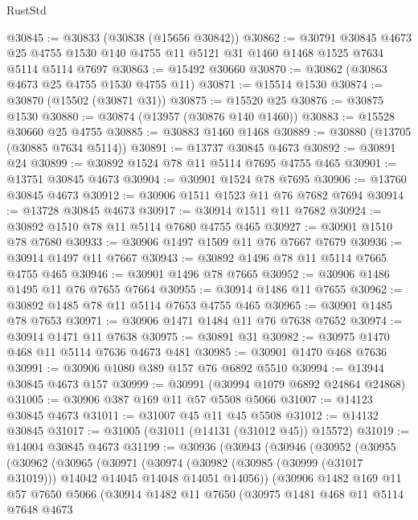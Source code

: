 \begin{lexlean}{RustStd}
\begin{coremodule}
@30845 := @30833 (@30838 (@15656 @30842))
@30862 := @30791
    @30845
    @4673
    @25
    @4755
    @1530
    @140
    @4755
    @11
    @5121
    @31
    @1460
    @1468
    @1525
    @7634
    @5114
    @5114
    @7697
@30863 := @15492 @30660
@30870 := @30862 (@30863 @4673 @25 @4755 @1530 @4755 @11)
@30871 := @15514 @1530
@30874 := @30870 (@15502 (@30871 @31))
@30875 := @15520 @25
@30876 := @30875 @1530
@30880 := @30874 (@13957 (@30876 @140 @1460))
@30883 := @15528 @30660 @25 @4755
@30885 := @30883 @1460 @1468
@30889 := @30880 (@13705 (@30885 @7634 @5114))
@30891 := @13737 @30845 @4673
@30892 := @30891 @24
@30899 := @30892 @1524 @78 @11 @5114 @7695 @4755 @465
@30901 := @13751 @30845 @4673
@30904 := @30901 @1524 @78 @7695
@30906 := @13760 @30845 @4673
@30912 := @30906 @1511 @1523 @11 @76 @7682 @7694
@30914 := @13728 @30845 @4673
@30917 := @30914 @1511 @11 @7682
@30924 := @30892 @1510 @78 @11 @5114 @7680 @4755 @465
@30927 := @30901 @1510 @78 @7680
@30933 := @30906 @1497 @1509 @11 @76 @7667 @7679
@30936 := @30914 @1497 @11 @7667
@30943 := @30892 @1496 @78 @11 @5114 @7665 @4755 @465
@30946 := @30901 @1496 @78 @7665
@30952 := @30906 @1486 @1495 @11 @76 @7655 @7664
@30955 := @30914 @1486 @11 @7655
@30962 := @30892 @1485 @78 @11 @5114 @7653 @4755 @465
@30965 := @30901 @1485 @78 @7653
@30971 := @30906 @1471 @1484 @11 @76 @7638 @7652
@30974 := @30914 @1471 @11 @7638
@30975 := @30891 @31
@30982 := @30975 @1470 @468 @11 @5114 @7636 @4673 @481
@30985 := @30901 @1470 @468 @7636
@30991 := @30906 @1080 @389 @157 @76 @6892 @5510
@30994 := @13944 @30845 @4673 @157
@30999 := @30991 (@30994 @1079 @6892 @24864 @24868)
@31005 := @30906 @387 @169 @11 @57 @5508 @5066
@31007 := @14123 @30845 @4673
@31011 := @31007 @45 @11 @45 @5508
@31012 := @14132 @30845
@31017 := @31005 (@31011 (@14131 (@31012 @45)) @15572)
@31019 := @14004 @30845 @4673
@31199 := @30936
    (@30943
      (@30946
        (@30952
          (@30955
            (@30962
              (@30965
                (@30971
                  (@30974
                    (@30982 (@30985 (@30999 (@31017 @31019))) @14042 @14045 @14048 @14051 @14056))
                  (@30906
                    @1482
                    @169
                    @11
                    @57
                    @7650
                    @5066
                    (@30914
                      @1482
                      @11
                      @7650
                      (@30975
                        @1481
                        @468
                        @11
                        @5114
                        @7648
                        @4673

\end{coremodule}
\end{lexlean}
